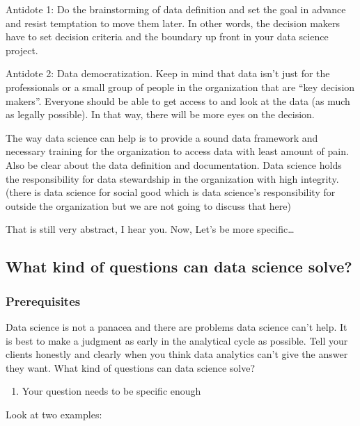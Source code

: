 \documentclass[12pt,]{krantz}
\providecommand{\tightlist}{%
  \setlength{\itemsep}{0pt}\setlength{\parskip}{0pt}}
\begin{document}
Antidote 1: Do the brainstorming of data definition and set the goal in advance and resist temptation to move them later. In other words, the decision makers have to set decision criteria and the boundary up front in your data science project.

Antidote 2: Data democratization. Keep in mind that data isn't just for the professionals or a small group of people in the organization that are ``key decision makers''. Everyone should be able to get access to and look at the data (as much as legally possible). In that way, there will be more eyes on the decision.

The way data science can help is to provide a sound data framework and necessary training for the organization to access data with least amount of pain. Also be clear about the data definition and documentation. Data science holds the responsibility for data stewardship in the organization with high integrity. (there is data science for social good which is data science's responsibility for outside the organization but we are not going to discuss that here)

That is still very abstract, I hear you. Now, Let's be more specific\ldots{}

\hypertarget{what-kind-of-questions-can-data-science-solve}{%
\subsection{What kind of questions can data science solve?}\label{what-kind-of-questions-can-data-science-solve}}

\hypertarget{prerequisites}{%
\subsubsection{Prerequisites}\label{prerequisites}}

Data science is not a panacea and there are problems data science can't help. It is best to make a judgment as early in the analytical cycle as possible. Tell your clients honestly and clearly when you think data analytics can't give the answer they want. What kind of questions can data science solve?

\begin{enumerate}
\def\labelenumi{\arabic{enumi}.}
\tightlist
\item
  Your question needs to be specific enough
\end{enumerate}

Look at two examples:
\end{document}
